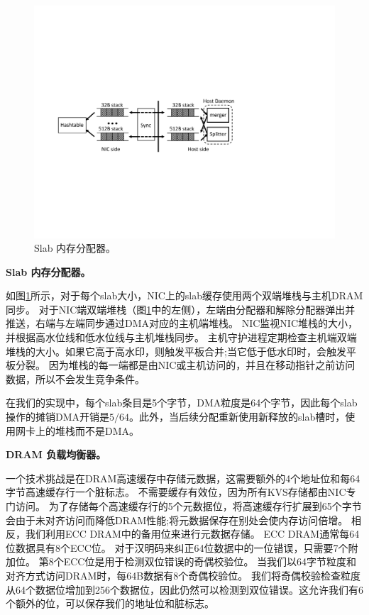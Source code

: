 \begin{figure}[t]
\centering
\includegraphics[width=.8\textwidth,page=1]{figure/cropped_slab.pdf}
\caption{Slab 内存分配器。}
\label{kvdirect:fig:slab}

\end{figure}

\textbf {Slab 内存分配器。}

如图\ref {kvdirect:fig:slab}所示，对于每个slab大小，NIC上的slab缓存使用两个双端堆栈与主机DRAM同步。
对于NIC端双端堆栈（图\ref {kvdirect:fig:slab}中的左侧），左端由分配器和解除分配器弹出并推送，右端与左端同步通过DMA对应的​​主机端堆栈。
NIC监视NIC堆栈的大小，并根据高水位线和低水位线与主机堆栈同步。
主机守护进程定期检查主机端双端堆栈的大小。如果它高于高水印，则触发平板合并;当它低于低水印时，会触发平板分裂。
因为堆栈的每一端都是由NIC或主机访问的，并且在移动指针之前访问数据，所以不会发生竞争条件。

在我们的实现中，每个slab条目是5个字节，DMA粒度是64个字节，因此每个slab操作的摊销DMA开销是$ 5/64 $。此外，当后续分配重新使用新释放的slab槽时，使用网卡上的堆栈而不是DMA。


\textbf{DRAM 负载均衡器。}

一个技术挑战是在DRAM高速缓存中存储元数据，这需要额外的4个地址位和每64字节高速缓存行一个脏标志。
不需要缓存有效位，因为所有KVS存储都由NIC专门访问。
为了存储每个高速缓存行的5个元数据位，将高速缓存行扩展到65个字节会由于未对齐访问而降低DRAM性能;将元数据保存在别处会使内存访问倍增。
相反，我们利用ECC DRAM中的备用位来进行元数据存储。
ECC DRAM通常每64位数据具有8个ECC位。
对于汉明码来纠正64位数据中的一位错误，只需要7个附加位。
第8个ECC位是用于检测双位错误的奇偶校验位。
当我们以64字节粒度和对齐方式访问DRAM时，每64B数据有8个奇偶校验位。
我们将奇偶校验检查粒度从64个数据位增加到256个数据位，因此仍然可以检测到双位错误。这允许我们有6个额外的位，可以保存我们的地址位和脏标志。

